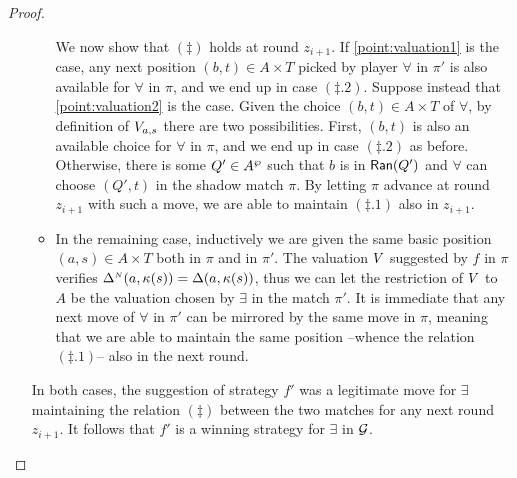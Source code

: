 \begin{proof}
\begin{enumerate}[(i)]
\begin{itemize}
      We now show that $(\ddag)$ holds at round $z_{i+1}$. If \eqref{point:valuation1} is the case, any next position $(b,t)\in A \times T$ picked by player $\forall$ in $\pi'$ is also available for $\forall$ in $\pi$, and we end up in case $(\ddag .2)$. Suppose instead that \eqref{point:valuation2} is the case. Given the choice $(b,t) \in A \times T$ of $\forall$, by definition of $V_{a,s}$ there are two possibilities. First, $(b,t)$ is also an available choice for $\forall$ in $\pi$, and we end up in case $(\ddag .2)$ as before. Otherwise, there is some $Q' \in A^{\wp}$ such that $b$ is in $\mathsf{Ran}(Q')$ and $\forall$ can choose $(Q',t)$ in the shadow match $\pi$. By letting $\pi$ advance at round $z_{i+1}$ with such a move, we are able to maintain $(\ddag .1)$ also in $z_{i+1}$.
  \item In the remaining case, inductively we are given the same basic position $(a,s) \in A\times T$ both in $\pi$ and in $\pi'$. The valuation $V$ suggested by $f$ in $\pi$ verifies $\Delta^{{\scriptscriptstyle N}}(a,\kappa(s)) = \Delta(a,\kappa(s))$, thus we can let the restriction of $V$ to $A$ be the valuation chosen by $\exists$ in the match $\pi'$. It is immediate that any next move of $\forall$ in $\pi'$ can be mirrored by the same move in $\pi$, meaning that we are able to maintain the same position --whence the relation $(\ddag.1)$-- also in the next round.
\end{itemize}
In both cases, the suggestion of strategy $f'$ was a legitimate move for $\exists$ maintaining the relation $(\ddag)$ between the two matches for any next round $z_{i+1}$. It follows that $f'$ is a winning strategy for $\exists$ in $\mathcal{G}$.
%
      \begin{comment} SHORTER ALTERNATIVE VERSION OF THE PROOF
      The idea is to define a strategy $f'$ for $\exists$ in stages, while playing a match $\pi'$ in $\mathcal{A}(\aut,\model)@(a_I,s_I)$. In parallel to $\pi'$, a shadow match $\pi$ in $\mathcal{A}(\mb{A}^{\noet},\model)@(a_I^{\noet},s_I)$ is maintained, where $\exists$ plays according to the strategy $f$. Since $f$ is winning and all macro-states from $\shA$ have an odd parity, in finitely many rounds the shadow match $\pi$ reaches a stage where $\mb{A}^{\noet}$ enters a state from $A$ and ``behaves as'' $\aut$ for all successive rounds. Thus $\pi$ can be assumed to have the following structure:
       \begin{enumerate}[(I)]
         \item there is an $n$ such that, for each round $z_i$ in the initial segment $z_0,z_1,\dots,z_n$ of $\pi$, a position of the form $(R,s) \in \shA \times T$ is visited and the valuation suggested by $f$ makes the disjunct $\shDe(R,\V(s))$ of $\Delta^{\noet}(R,\V(s))$ true in $\R{s}$.

\end{comment}
\end{enumerate}
\end{proof}
